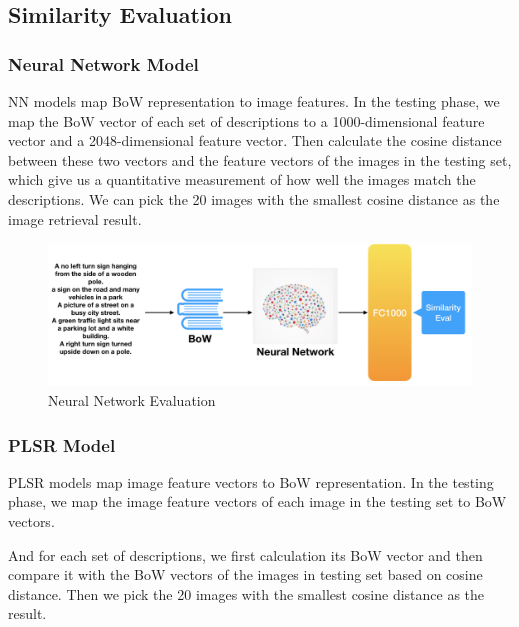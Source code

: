 \documentclass{article}
\begin{document}
\subsection{Similarity Evaluation}
\subsubsection{Neural Network Model}

NN models map BoW representation to image features. In the testing phase, we map the BoW vector of each set of descriptions to a 1000-dimensional feature vector and a 2048-dimensional feature vector. Then calculate the cosine distance between these two vectors and the feature vectors of the images in the testing set, which give us a quantitative measurement of how well the images match the descriptions. We can pick the 20 images with the smallest cosine distance as the image retrieval result. 

\begin{figure}[h]
  \centering
  \includegraphics[width=\textwidth]{NNEval}
  \caption{Neural Network Evaluation}
\end{figure}

\subsubsection{PLSR Model}

PLSR models map image feature vectors to BoW representation. In the testing phase, we map the image feature vectors of each image in  the testing set to BoW vectors.

And for each set of descriptions, we first calculation its BoW vector and then compare it with the BoW vectors of the images in testing set based on cosine distance. Then we pick the 20 images with the smallest cosine distance as the result.
\end{document}
